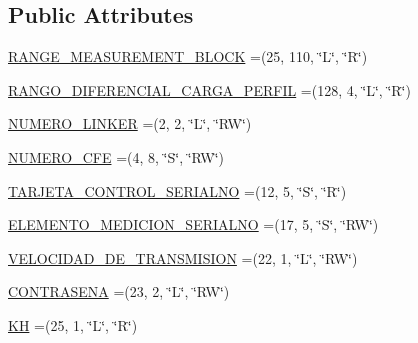 \subsection*{Public Attributes}
\begin{DoxyCompactItemize}
\item 
\hyperlink{enumcom_1_1eneri_1_1scorpio__metertool_1_1devices_1_1_register_a9ae33ca3117ccd868cf343caa4c95a7c}{R\+A\+N\+G\+E\+\_\+\+M\+E\+A\+S\+U\+R\+E\+M\+E\+N\+T\+\_\+\+B\+L\+O\+CK} =(25, 110, \char`\"{}L\char`\"{}, \char`\"{}R\char`\"{})
\item 
\hyperlink{enumcom_1_1eneri_1_1scorpio__metertool_1_1devices_1_1_register_a017964ca91dc5f9ee3f191441d2e43fe}{R\+A\+N\+G\+O\+\_\+\+D\+I\+F\+E\+R\+E\+N\+C\+I\+A\+L\+\_\+\+C\+A\+R\+G\+A\+\_\+\+P\+E\+R\+F\+IL} =(128, 4, \char`\"{}L\char`\"{}, \char`\"{}R\char`\"{})
\item 
\hyperlink{enumcom_1_1eneri_1_1scorpio__metertool_1_1devices_1_1_register_a8f886e5dd265b1131588d6baf61d93e0}{N\+U\+M\+E\+R\+O\+\_\+\+L\+I\+N\+K\+ER} =(2, 2, \char`\"{}L\char`\"{}, \char`\"{}RW\char`\"{})
\item 
\hyperlink{enumcom_1_1eneri_1_1scorpio__metertool_1_1devices_1_1_register_a4b7c947ae37ecd9faa66accca80248fa}{N\+U\+M\+E\+R\+O\+\_\+\+C\+FE} =(4, 8, \char`\"{}S\char`\"{}, \char`\"{}RW\char`\"{})
\item 
\hyperlink{enumcom_1_1eneri_1_1scorpio__metertool_1_1devices_1_1_register_ac4623f241783ae843766311ace76fa8f}{T\+A\+R\+J\+E\+T\+A\+\_\+\+C\+O\+N\+T\+R\+O\+L\+\_\+\+S\+E\+R\+I\+A\+L\+NO} =(12, 5, \char`\"{}S\char`\"{}, \char`\"{}R\char`\"{})
\item 
\hyperlink{enumcom_1_1eneri_1_1scorpio__metertool_1_1devices_1_1_register_a0814549efb11afe2854b07a2e123cd48}{E\+L\+E\+M\+E\+N\+T\+O\+\_\+\+M\+E\+D\+I\+C\+I\+O\+N\+\_\+\+S\+E\+R\+I\+A\+L\+NO} =(17, 5, \char`\"{}S\char`\"{}, \char`\"{}RW\char`\"{})
\item 
\hyperlink{enumcom_1_1eneri_1_1scorpio__metertool_1_1devices_1_1_register_a8460146a8fd94fa30d944da21f6b81a0}{V\+E\+L\+O\+C\+I\+D\+A\+D\+\_\+\+D\+E\+\_\+\+T\+R\+A\+N\+S\+M\+I\+S\+I\+ON} =(22, 1, \char`\"{}L\char`\"{}, \char`\"{}RW\char`\"{})
\item 
\hyperlink{enumcom_1_1eneri_1_1scorpio__metertool_1_1devices_1_1_register_a9c9646e237bbf73828b7845e67df1ea4}{C\+O\+N\+T\+R\+A\+S\+E\+NA} =(23, 2, \char`\"{}L\char`\"{}, \char`\"{}RW\char`\"{})
\item 
\hyperlink{enumcom_1_1eneri_1_1scorpio__metertool_1_1devices_1_1_register_ab9c0aaad1a9b4d36469f4058a0e6e47e}{KH} =(25, 1, \char`\"{}L\char`\"{}, \char`\"{}R\char`\"{})

\end{DoxyCompactItemize}

